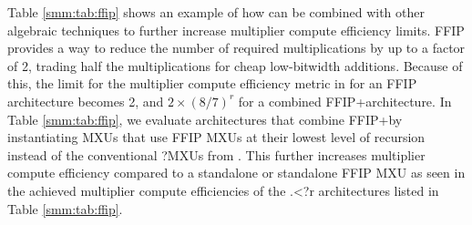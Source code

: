 Table \ref{smm:tab:ffip} shows an example of how \smm can be combined with other algebraic techniques to further increase multiplier compute efficiency limits.
FFIP \cite{pogue2024fast} provides a way to reduce the number
of required multiplications by up to a factor of 2, trading half the multiplications for cheap low-bitwidth additions.
Because of this, the limit for the multiplier compute efficiency metric in  for an FFIP architecture becomes 2, and $2\times(8/7)^r$ for a combined FFIP+\smmArch architecture.
In Table \ref{smm:tab:ffip}, we evaluate architectures that combine FFIP+\smmArch by instantiating \smmArch MXUs that use FFIP MXUs at their lowest level of recursion instead of the conventional \mm?\zero MXUs from .
This further increases multiplier compute efficiency compared to a standalone \smmArch or standalone FFIP MXU as seen in the achieved multiplier compute efficiencies of the \sAlg.\sffip<{}?{r} architectures listed in Table \ref{smm:tab:ffip}.
